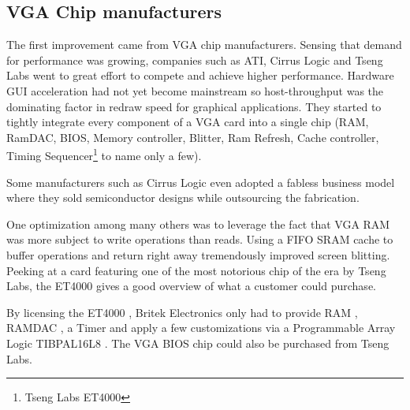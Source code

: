 \subsection{VGA Chip manufacturers}
The first improvement came from VGA chip manufacturers. Sensing that demand for performance was growing, companies such as ATI, Cirrus Logic and Tseng Labs went to great effort to compete and achieve higher performance. Hardware GUI acceleration had not yet become mainstream so host-throughput was the dominating factor in redraw speed for graphical applications. They started to tightly integrate every component of a VGA card into a single chip (RAM, RamDAC, BIOS, Memory controller, Blitter, Ram Refresh, Cache controller, Timing Sequencer\footnote{Tseng Labs ET4000} to name only a few).\\
\par
Some manufacturers such as Cirrus Logic even adopted a fabless business model where they sold semiconductor designs while outsourcing the fabrication.


One optimization among many others was to leverage the fact that VGA RAM was more subject to write operations than reads. Using a FIFO SRAM cache to buffer operations and return right away tremendously improved screen blitting. Peeking at a card featuring one of the most notorious chip of the era by Tseng Labs, the ET4000 gives a good overview of what a customer could purchase.\\ 
\par
{}
\par
By licensing the ET4000 , Britek Electronics only had to provide RAM , RAMDAC , a Timer  and apply a few customizations via a Programmable Array Logic TIBPAL16L8 . The VGA BIOS chip  could also be purchased from Tseng Labs.\\
\par
\vspace{10pt}

\par



